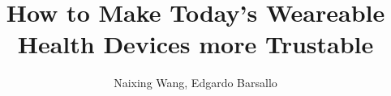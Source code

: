 \documentclass[11pt, draftclsnofoot, onecolumn]{IEEEtran}
\begin{document}
	\title{How to Make Today's Weareable Health Devices more Trustable}
	
	
	
	\author{Naixing Wang, Edgardo Barsallo}
	
	
	
\end{document}
